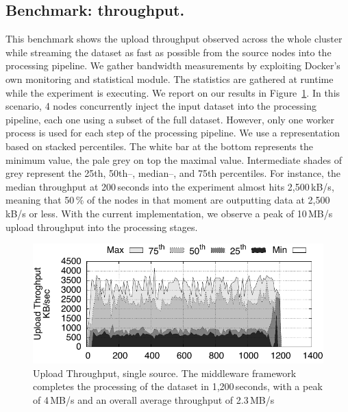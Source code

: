 \subsection{Benchmark: throughput.}
This benchmark shows the upload throughput observed across the whole cluster while streaming the dataset as fast as possible from the source nodes into the processing pipeline.
We gather bandwidth measurements by exploiting Docker's own monitoring and statistical module.
The statistics are gathered at runtime while the experiment is executing.
We report on our results in Figure~\ref{fig:throughput}.
In this scenario, 4 nodes concurrently inject the input dataset into the processing pipeline, each one using a subset of the full dataset.
However, only one worker process is used for each step of the processing pipeline.
We use a representation based on stacked percentiles.
The white bar at the bottom represents the minimum value, the pale grey on top the maximal value.
Intermediate shades of grey represent the 25th, 50th–, median–, and 75th percentiles.
For instance, the median throughput at 200\,seconds into the experiment almost hits 2,500\,kB/s, meaning that 50\,\% of the nodes in that moment are outputting data at 2,500\,kB/s or less.
With the current implementation, we observe a peak of 10\,MB/s upload throughput into the processing stages.%


\begin{figure}[t!]
  \centering
  \includegraphics[scale=0.7]{images/tput_upload_4-datas-1-worker.pdf}
  \caption{Upload Throughput, single source. The middleware framework completes the processing of the dataset in 1,200\,seconds, with a peak of 4\,MB/s and an overall average throughput of 2.3\,MB/s}
  \label{fig:throughput}
\end{figure}

